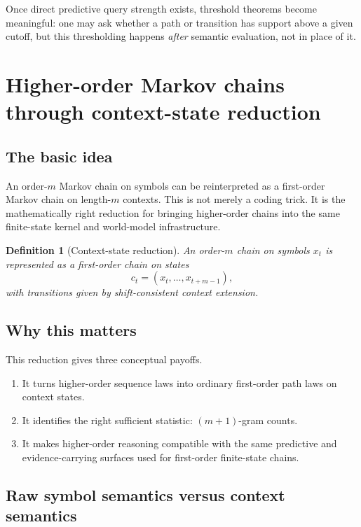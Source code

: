 \documentclass[11pt]{article}
\newtheorem{definition}{Definition}
\begin{document}
Once direct predictive query strength exists, threshold theorems become
meaningful: one may ask whether a path or transition has support above a given
cutoff, but this thresholding happens \emph{after} semantic evaluation, not in
place of it.

\section{Higher-order Markov chains through context-state reduction}

\subsection{The basic idea}

An order-$m$ Markov chain on symbols can be reinterpreted as a first-order
Markov chain on length-$m$ contexts.  This is not merely a coding trick.  It
is the mathematically right reduction for bringing higher-order chains into the
same finite-state kernel and world-model infrastructure.

\begin{definition}[Context-state reduction]
An order-$m$ chain on symbols $x_t$ is represented as a first-order chain on
states
\[
c_t = (x_t,\ldots,x_{t+m-1}),
\]
with transitions given by shift-consistent context extension.
\end{definition}

\subsection{Why this matters}

This reduction gives three conceptual payoffs.
\begin{enumerate}
  \item It turns higher-order sequence laws into ordinary first-order path laws
        on context states.
  \item It identifies the right sufficient statistic: $(m+1)$-gram counts.
  \item It makes higher-order reasoning compatible with the same predictive and
        evidence-carrying surfaces used for first-order finite-state chains.
\end{enumerate}

\subsection{Raw symbol semantics versus context semantics}
\end{document}

